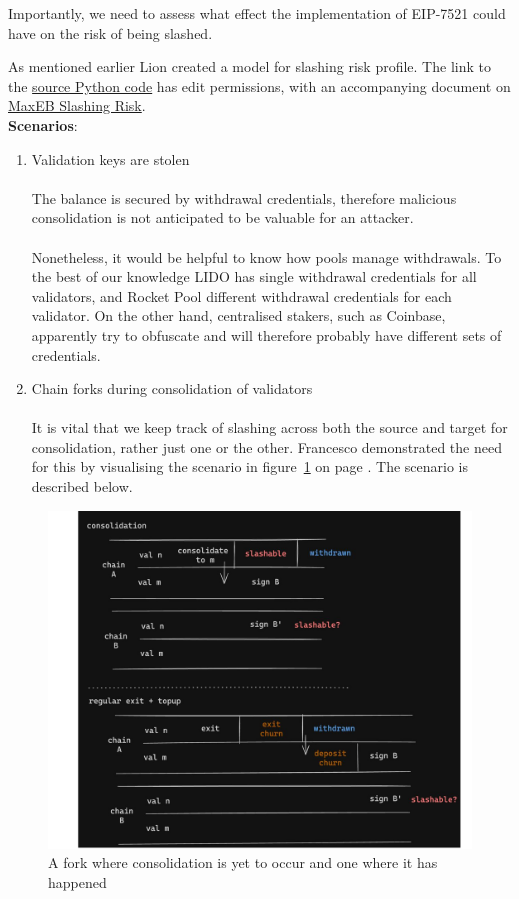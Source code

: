 Importantly, we need to assess what effect the implementation of EIP-7521 could have on the risk of being slashed.

As mentioned earlier Lion created a model for slashing risk profile. The link to the \href{https://colab.research.google.com/drive/1lBe4qH4oqI8D9cmcQGca3O1AdR3SVr5z?usp=sharing}{source Python code} has edit permissions, with an accompanying document on \href{https://hackmd.io/@dapplion/maxeb_slashing_risks}{MaxEB Slashing Risk}. \\

\noindent
\textbf{Scenarios}: 
\begin{enumerate}
\item Validation keys are stolen\\
\\
The balance is secured by withdrawal credentials, therefore malicious consolidation is not anticipated to be valuable for an attacker. \\
\\
Nonetheless, it would be helpful to know how pools manage withdrawals. To the best of our knowledge LIDO has single withdrawal credentials for all validators, and Rocket Pool different withdrawal credentials for each validator. On the other hand, centralised stakers, such as Coinbase, apparently try to obfuscate and will therefore probably have different sets of credentials.

\item Chain forks during consolidation of validators \\
\\
It is vital that we keep track of slashing across both the source and target for consolidation, rather just one or the other. Francesco demonstrated the need for this by visualising the scenario in figure~\ref{fig:francesco1} on page \pageref{fig:francesco1}. The scenario is described below.
\end{enumerate}

\begin{figure}[htbp]
\begin{center}
\includegraphics[width=0.7\linewidth]{images/francesco1}
\caption{A fork where consolidation is yet to occur and one where it has happened}
\label{fig:francesco1}
\end{center}
\end{figure}

